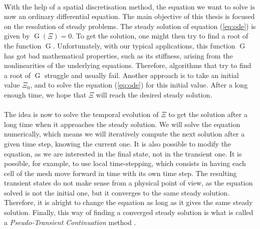     \paragraph{}
    With the help of a spatial discretisation method, the equation we want to solve is now an ordinary differential equation.
    The main objective of this thesis is focused on the resolution of steady problems.
    The steady solution of equation (\ref{eq:ode}) is given by $\operatorname{G}\left(\Xi\right) = 0$.
    To get the solution, one might then try to find a root of the function $\operatorname{G}$.
    Unfortunately, with our typical applications, this function $\operatorname{G}$ has got bad mathematical properties, such as its stiffness, arising from the nonlinearities of the underlying equations.
    Therefore, algorithms that try to find a root of $\operatorname{G}$ struggle and usually fail.
    Another approach is to take an initial value $\Xi_0$, and to solve the equation (\ref{eq:ode}) for this initial value.
    After a long enough time, we hope that $\Xi$ will reach the desired steady solution.

    \paragraph{}
    The idea is now to solve the temporal evolution of $\Xi$ to get the solution after a long time when it approaches the steady solution.
    We will solve the equation numerically, which means we will iteratively compute the next solution after a given time step, knowing the current one.
    It is also possible to modify the equation, as we are interested in the final state, not in the transient one.
    It is possible, for example, to use local time-stepping, which consists in having each cell of the mesh move forward in time with its own time step.
    The resulting transient states do not make sense from a physical point of view, as the equation solved is not the initial one, but it converges to the same steady solution.
    Therefore, it is alright to change the equation as long as it gives the same steady solution.
    Finally, this way of finding a converged steady solution is what is called a \emph{Pseudo-Transient Continuation} method \cite{KelleyKeyes1996}.

